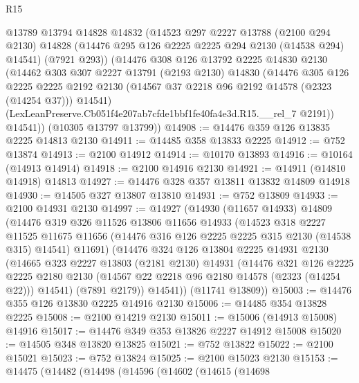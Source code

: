 \begin{lexlean}{R15}
\begin{coremodule}
        @13789
        @13794
        @14828
        @14832
        (@14523
          @297
          @2227
          @13788
          (@2100 @294 @2130)
          @14828
          (@14476 @295 @126 @2225 @2225 @294 @2130 (@14538 @294) @14541)
          (@7921 @293))
        (@14476
          @308
          @126
          @13792
          @2225
          @14830
          @2130
          (@14462
            @303
            @307
            @2227
            @13791
            (@2193 @2130)
            @14830
            (@14476
              @305
              @126
              @2225
              @2225
              @2192
              @2130
              (@14567 @37 @2218 @96 @2192 @14578 (@2323 (@14254 @37)))
              @14541)
            (LexLeanPreserve.Cb051f4e207ab7cfde1bbf1fe40fa4e3d.R15.__rel_7 @2191))
          @14541))
      (@10305 @13797 @13799))
@14908 := @14476 @359 @126 @13835 @2225 @14813 @2130
@14911 := @14485 @358 @13833 @2225
@14912 := @752 @13874
@14913 := @2100 @14912
@14914 := @10170 @13893
@14916 := @10164 (@14913 @14914)
@14918 := @2100 @14916 @2130
@14921 := @14911 (@14810 @14918) @14813
@14927 := @14476 @328 @357 @13811 @13832 @14809 @14918
@14930 := @14505 @327 @13807 @13810
@14931 := @752 @13809
@14933 := @2100 @14931 @2130
@14997 := @14927
    (@14930
      (@11657 @14933)
      @14809
      (@14476
        @319
        @326
        @11526
        @13806
        @11656
        @14933
        (@14523
          @318
          @2227
          @11525
          @11675
          @11656
          (@14476 @316 @126 @2225 @2225 @315 @2130 (@14538 @315) @14541)
          @11691)
        (@14476
          @324
          @126
          @13804
          @2225
          @14931
          @2130
          (@14665
            @323
            @2227
            @13803
            (@2181 @2130)
            @14931
            (@14476
              @321
              @126
              @2225
              @2225
              @2180
              @2130
              (@14567 @22 @2218 @96 @2180 @14578 (@2323 (@14254 @22)))
              @14541)
            (@7891 @2179))
          @14541))
      (@11741 @13809))
@15003 := @14476 @355 @126 @13830 @2225 @14916 @2130
@15006 := @14485 @354 @13828 @2225
@15008 := @2100 @14219 @2130
@15011 := @15006 (@14913 @15008) @14916
@15017 := @14476 @349 @353 @13826 @2227 @14912 @15008
@15020 := @14505 @348 @13820 @13825
@15021 := @752 @13822
@15022 := @2100 @15021
@15023 := @752 @13824
@15025 := @2100 @15023 @2130
@15153 := @14475
    (@14482
      (@14498
        (@14596
          (@14602
            (@14615
              (@14698

\end{coremodule}
\end{lexlean}
